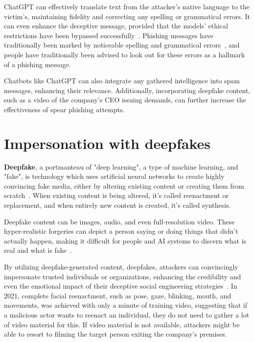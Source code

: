 ChatGPT can effectively translate text from the attacker’s native language to the victim’s, maintaining fidelity and correcting any spelling or grammatical errors. It can even enhance the deceptive message, provided that the models' ethical restrictions have been bypassed successfully~\citep{NULL}.
Phishing messages have traditionally been marked by noticeable spelling and grammatical errors~\citep{herleySoLongAndNoThanksForTheExternalities2009}, and people have traditionally been advised to look out for these errors as a hallmark of a phishing message.


Chatbots like ChatGPT can also integrate any gathered intelligence into spam messages, enhancing their relevance. Additionally, incorporating deepfake content, such as a video of the company’s CEO issuing demands, can further increase the effectiveness of spear phishing attempts.



\section{Impersonation with deepfakes}
\begin{comment}

What to cover:
    - How deepfake models are trained?
    
\end{comment}

\textbf{Deepfake}, a portmanteau of "deep learning", a type of machine learning, and "fake", is technology which uses artificial neural networks to create highly convincing fake media, either by altering existing content or creating them from scratch~\citep{mirsky_Creation_Detection_Deepfakes_2021}. When existing content is being altered, it's called reenactment or replacement, and when entirely new content is created, it's called synthesis.

Deepfake content can be images, audio, and even full-resolution video. These hyper-realistic forgeries can depict a person saying or doing things that didn't actually happen, making it difficult for people and AI systems to discern what is real and what is fake~\citep{blauth_AI_Crime_Overview_Malicious_Use_Abuse_2022}.


By utilizing deepfake-generated content, deepfakes, attackers can convincingly impersonate trusted individuals or organizations, enhancing the credibility and even the emotional impact of their deceptive social engineering strategies~\citep{mirsky_Creation_Detection_Deepfakes_2021}. In 2021, complete facial reenactment, such as pose, gaze, blinking, mouth, and movements, was achieved with only a minute of training video, suggesting that if a malicious actor wants to reenact an individual, they do not need to gather a lot of video material for this. If video material is not available, attackers might be able to resort to filming the target person exiting the company's premises.



